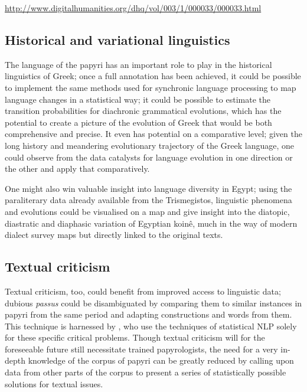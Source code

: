 \url{http://www.digitalhumanities.org/dhq/vol/003/1/000033/000033.html}
\cite{bamman2008building,bammandhq2009}

\subsection{Historical and variational linguistics} %
\label{sec:histlinguistics}
The language of the papyri has an important role to play in the
historical linguistics of Greek; once a full annotation has been
achieved, it could be possible to implement the same methods used for
synchronic language processing to map language changes in a
statistical way; it could be possible to estimate the transition
probabilities for diachronic grammatical evolutions, which has the
potential to create a picture of the evolution of Greek that would be
both comprehensive and precise. It even has potential on a comparative
level; given the long history and meandering evolutionary trajectory
of the Greek language, one could observe from the data catalysts for
language evolution in one direction or the other and apply that
comparatively.

One might also win valuable insight into language diversity in Egypt;
using the paraliterary data already available from the Trismegistos,
linguistic phenomena and evolutions could be visualised on a map and
give insight into the diatopic, diastratic and diaphasic variation of
Egyptian koin\^e, much in the way of modern dialect survey maps but
directly linked to the original texts.

\subsection{Textual criticism}
\label{sec:textualcriticism}
Textual criticism, too, could benefit from improved access to
linguistic data; dubious \textit{passus} could be disambiguated by
comparing them to similar instances in papyri from the same period and
adapting constructions and words from them.  This technique is
harnessed by \cite{mimno2009}, who use the techniques of statistical
NLP solely for these specific critical problems.  Though textual
criticism will for the foreseeable future still necessitate trained
papyrologists, the need for a very in-depth knowledge of the corpus of
papyri can be greatly reduced by calling upon data from other parts of
the corpus to present a series of statistically possible solutions for
textual issues.